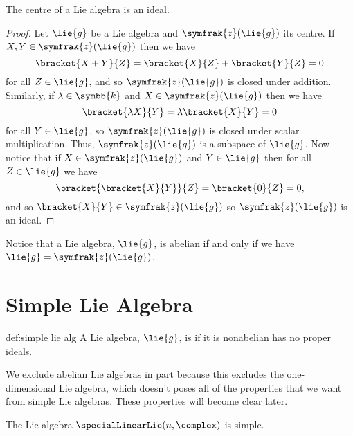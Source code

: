\documentclass[fleqn]{NotesClass}
\renewcommand{\field}{\symbb{k}}
\newcommand{\centre}{\symfrak{z}}
\begin{document}
    \begin{lma}{}{}
        The centre of a Lie algebra is an ideal.
        \begin{proof}
            Let \(\lie{g}\) be a Lie algebra and \(\centre(\lie{g})\) its centre.
            If \(X, Y \in \centre(\lie{g})\) then we have
            \begin{equation}
                \bracket{X + Y}{Z} = \bracket{X}{Z} + \bracket{Y}{Z} = 0
            \end{equation}
            for all \(Z \in \lie{g}\), and so \(\centre(\lie{g})\) is closed under addition.
            Similarly, if \(\lambda \in \field\) and \(X \in \centre(\lie{g})\) then we have
            \begin{equation}
                \bracket{\lambda X}{Y} = \lambda \bracket{X}{Y} = 0
            \end{equation}
            for all \(Y \in \lie{g}\), so \(\centre(\lie{g})\) is closed under scalar multiplication.
            Thus, \(\centre(\lie{g})\) is a subspace of \(\lie{g}\).
            Now notice that if \(X \in \centre(\lie{g})\) and \(Y \in \lie{g}\) then for all \(Z \in \lie{g}\) we have
            \begin{equation}
                \bracket{\bracket{X}{Y}}{Z} = \bracket{0}{Z} = 0,
            \end{equation}
            and so \(\bracket{X}{Y} \in \centre(\lie{g})\) so \(\centre(\lie{g})\) is an ideal.
        \end{proof}
    \end{lma}
    
    Notice that a Lie algebra, \(\lie{g}\), is abelian if and only if we have \(\lie{g} = \centre(\lie{g})\).
    
    \section{Simple Lie Algebra}
    \begin{dfn}{}{def:simple lie alg}
        A Lie algebra, \(\lie{g}\), is  if it is nonabelian has no proper ideals.
    \end{dfn}
    
    We exclude abelian Lie algebras in part because this excludes the one-dimensional Lie algebra, which doesn't poses all of the properties that we want from simple Lie algebras.
    These properties will become clear later.
    
    \begin{exm}{}{}
        The Lie algebra \(\specialLinearLie(n, \complex)\) is simple.
    \end{exm}
    
\end{document}
